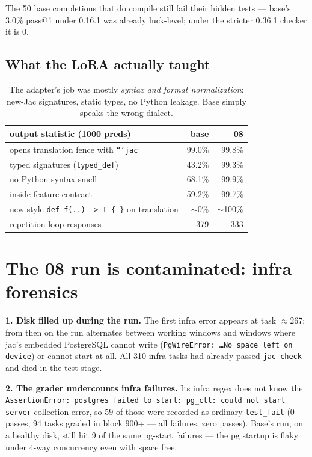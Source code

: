 \documentclass[10pt,a4paper]{article}
\newcommand{\good}[1]{\textcolor{green!55!black}{#1}}
\newcommand{\bad}[1]{\textcolor{red!75!black}{#1}}
\begin{document}
The 50 base completions that do compile still fail their hidden tests --- base's 3.0\%
pass@1 under 0.16.1 was already luck-level; under the stricter 0.36.1 checker it is 0.

\subsection*{What the LoRA actually taught}

\begin{table}[h]
\centering\small
\begin{tabular}{lrr}
\toprule
output statistic (1000 preds) & base & 08 \\
\midrule
opens translation fence with \texttt{```jac} & 99.0\% & 99.8\% \\
typed signatures (\texttt{typed\_def})       & 43.2\% & \good{99.3\%} \\
no Python-syntax smell                       & 68.1\% & \good{99.9\%} \\
inside feature contract                      & 59.2\% & \good{99.7\%} \\
new-style \texttt{def f(..) -> T \{ \}} on translation & \bad{$\sim$0\%} & \good{$\sim$100\%} \\
repetition-loop responses                    & 379 & 333 \\
\bottomrule
\end{tabular}
\caption{The adapter's job was mostly \emph{syntax and format normalization}: new-Jac
signatures, static types, no Python leakage. Base simply speaks the wrong dialect.}
\end{table}

\section{The 08 run is contaminated: infra forensics}
\label{sec:infra}

\textbf{1. Disk filled up during the run.} The first infra error appears at task
$\approx$267; from then on the run alternates between working windows and windows where
jac's embedded PostgreSQL cannot write (\texttt{PgWireError: \dots No space left on
device}) or cannot start at all. All 310 infra tasks had already passed
\texttt{jac check} and died in the test stage.

\textbf{2. The grader undercounts infra failures.} Its infra regex does not know the
\texttt{AssertionError: postgres failed to start: pg\_ctl: could not start server}
collection error, so 59 of those were recorded as ordinary \texttt{test\_fail}
(0 passes, 94 tasks graded in block 900+ --- all failures, zero passes).
Base's run, on a healthy disk, still hit 9 of the same pg-start failures --- the pg
startup is flaky under 4-way concurrency even with space free.
\end{document}

